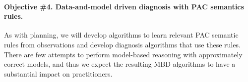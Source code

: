 \documentclass[12pt]{article}
\newcommand{\note}[1]{\textbf{\textit{#1}}}
\begin{document}




\vspace{-0.35cm}
\paragraph{Objective \#4. Data-and-model driven diagnosis with PAC semantics rules.} 
As with planning, we will develop algorithms to learn 
relevant PAC semantic rules from observations and develop diagnosis algorithms that use these rules. There are few attempts to perform model-based reasoning with approximately correct models, and thus we expect the resulting MBD algorithms to have a substantial impact on practitioners.  






\end{document}

